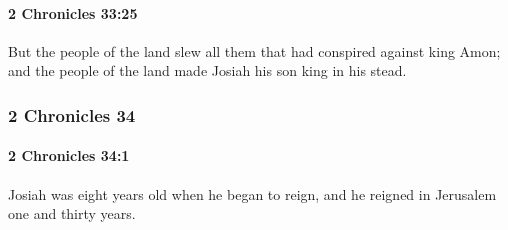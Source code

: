 		\paragraph{2 Chronicles 33:25} %
			\label{2CHRONICLES-33-25}

			But the people of the land slew all them that had conspired against king Amon; and the people of the land made Josiah his son king in his stead.

	\subsubsection{2 Chronicles 34} %
		\label{2CHRONICLES-34}

		\paragraph{2 Chronicles 34:1} %
			\label{2CHRONICLES-34-1}

			Josiah was eight years old when he began to reign, and he reigned in Jerusalem one and thirty years.

